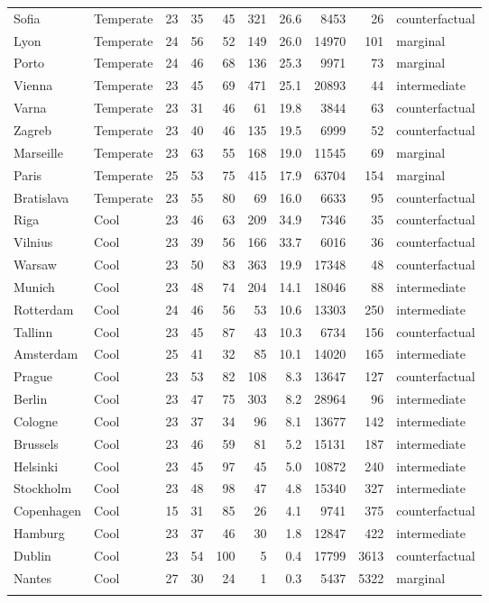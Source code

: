 \begin{longtable}{llrrrrrrrl}
  Sofia & Temperate & 23 & 35 & 45 & 321 & 26.6 & 8453 & 26 & counterfactual \\ 
  Lyon & Temperate & 24 & 56 & 52 & 149 & 26.0 & 14970 & 101 & marginal \\ 
  Porto & Temperate & 24 & 46 & 68 & 136 & 25.3 & 9971 & 73 & marginal \\ 
  Vienna & Temperate & 23 & 45 & 69 & 471 & 25.1 & 20893 & 44 & intermediate \\ 
  Varna & Temperate & 23 & 31 & 46 & 61 & 19.8 & 3844 & 63 & counterfactual \\ 
  Zagreb & Temperate & 23 & 40 & 46 & 135 & 19.5 & 6999 & 52 & counterfactual \\ 
  Marseille & Temperate & 23 & 63 & 55 & 168 & 19.0 & 11545 & 69 & marginal \\ 
  Paris & Temperate & 25 & 53 & 75 & 415 & 17.9 & 63704 & 154 & marginal \\ 
  Bratislava & Temperate & 23 & 55 & 80 & 69 & 16.0 & 6633 & 95 & counterfactual \\ 
  Riga & Cool & 23 & 46 & 63 & 209 & 34.9 & 7346 & 35 & counterfactual \\ 
  Vilnius & Cool & 23 & 39 & 56 & 166 & 33.7 & 6016 & 36 & counterfactual \\ 
  Warsaw & Cool & 23 & 50 & 83 & 363 & 19.9 & 17348 & 48 & counterfactual \\ 
  Munich & Cool & 23 & 48 & 74 & 204 & 14.1 & 18046 & 88 & intermediate \\ 
  Rotterdam & Cool & 24 & 46 & 56 & 53 & 10.6 & 13303 & 250 & intermediate \\ 
  Tallinn & Cool & 23 & 45 & 87 & 43 & 10.3 & 6734 & 156 & counterfactual \\ 
  Amsterdam & Cool & 25 & 41 & 32 & 85 & 10.1 & 14020 & 165 & intermediate \\ 
  Prague & Cool & 23 & 53 & 82 & 108 & 8.3 & 13647 & 127 & counterfactual \\ 
  Berlin & Cool & 23 & 47 & 75 & 303 & 8.2 & 28964 & 96 & intermediate \\ 
  Cologne & Cool & 23 & 37 & 34 & 96 & 8.1 & 13677 & 142 & intermediate \\ 
  Brussels & Cool & 23 & 46 & 59 & 81 & 5.2 & 15131 & 187 & intermediate \\ 
  Helsinki & Cool & 23 & 45 & 97 & 45 & 5.0 & 10872 & 240 & intermediate \\ 
  Stockholm & Cool & 23 & 48 & 98 & 47 & 4.8 & 15340 & 327 & intermediate \\ 
  Copenhagen & Cool & 15 & 31 & 85 & 26 & 4.1 & 9741 & 375 & counterfactual \\ 
  Hamburg & Cool & 23 & 37 & 46 & 30 & 1.8 & 12847 & 422 & intermediate \\ 
  Dublin & Cool & 23 & 54 & 100 & 5 & 0.4 & 17799 & 3613 & counterfactual \\ 
  Nantes & Cool & 27 & 30 & 24 & 1 & 0.3 & 5437 & 5322 & marginal \\ 
   \bottomrule
\label{tab:ews_by_city}
\end{longtable}
\endgroup
